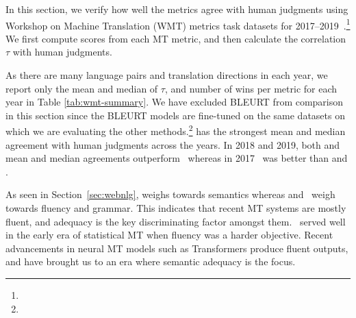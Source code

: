 In this section, we verify how well the metrics agree with human judgments using Workshop on Machine Translation (WMT) metrics task datasets for 2017--2019~\cite{WMT17-metrics,WMT18-metrics,WMT19-metrics-proceedings}.\footnote{}
We first compute scores from each MT metric, and then calculate the correlation $\tau$ with human judgments.

As there are many language pairs and translation directions in each year, we report only the mean and median of $\tau$, and number of wins per metric for each year in Table \ref{tab:wmt-summary}. %
We have excluded BLEURT from comparison in this section since the BLEURT models are fine-tuned on the same datasets on which we are evaluating the other methods.\footnote{}
 has the strongest mean and median agreement with human judgments across the years.
In 2018 and 2019, both  and  mean and median agreements outperform \bleu\, whereas in 2017 \bleu\ was better than  and .%

As seen in Section~\ref{sec:webnlg},  weighs towards semantics whereas  and \bleu\ weigh towards fluency and grammar.
This indicates that recent MT systems are mostly fluent, and adequacy is the key discriminating factor amongst them.
\bleu\ served well in the early era of statistical MT when fluency was a harder objective. 
Recent advancements in neural MT models such as Transformers \cite{vaswani2017attention} produce fluent outputs, and have brought us to an era where semantic adequacy is the focus.



